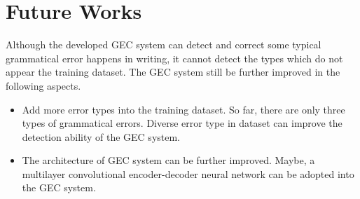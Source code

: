 \chapter{Future Works}
\label{chapter8}

Although the developed GEC system can detect and correct some typical grammatical error happens in writing, it cannot detect the types which do not appear the training dataset. The GEC system still be further improved in the following aspects.
\begin{itemize}
    \item Add more error types into the training dataset. So far, there are only three types of grammatical errors. Diverse error type in dataset can improve the detection ability of the GEC system.
    \item The architecture of GEC system can be further improved. Maybe, a multilayer convolutional encoder-decoder neural network can be adopted into the GEC system.
\end{itemize}

